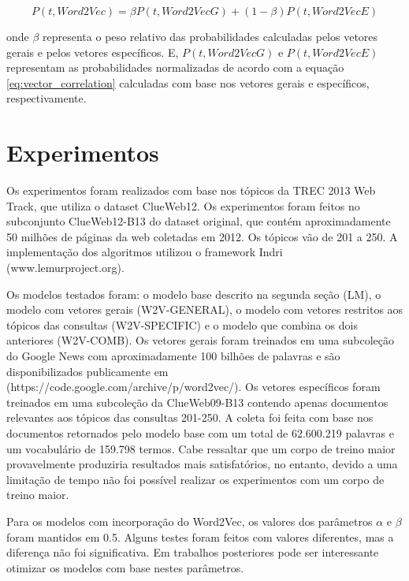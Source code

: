 \documentclass{article}
\begin{document}
\begin{equation}\label{eq:lm_with_w2vec}
P(t, Word2Vec) = \beta P(t, Word2VecG) + (1-\beta) P(t, Word2VecE)
\end{equation}

onde $ \beta $ representa o peso relativo das probabilidades calculadas pelos vetores gerais e pelos
vetores específicos. E, $ P(t, Word2VecG) $ e $ P(t, Word2VecE) $ representam as probabilidades
normalizadas de acordo com a equação \ref{eq:vector_correlation} calculadas com base nos vetores gerais e 
específicos, respectivamente.

\section{Experimentos}

Os experimentos foram realizados com base nos tópicos da TREC 2013 Web Track, que utiliza o dataset ClueWeb12. Os experimentos
foram feitos no subconjunto ClueWeb12-B13 do dataset original, que contém aproximadamente 50 milhões de páginas da web coletadas
em 2012. Os tópicos vão de 201 a 250. A implementação dos algoritmos utilizou o framework Indri (www.lemurproject.org). 

Os modelos testados foram: o modelo base descrito na segunda seção (LM), o modelo com vetores gerais (W2V-GENERAL), o modelo
com vetores restritos aos tópicos das consultas (W2V-SPECIFIC) e o modelo que combina os dois anteriores (W2V-COMB). Os vetores
gerais foram treinados em uma subcoleção do Google News com aproximadamente 100 bilhões de palavras e são disponibilizados publicamente
em (https://code.google.com/archive/p/word2vec/). Os vetores específicos foram treinados em uma subcoleção da ClueWeb09-B13 contendo
apenas documentos relevantes aos tópicos das consultas 201-250. A coleta foi feita com base nos documentos retornados pelo
modelo base com um total de 62.600.219 palavras e um vocabulário de 159.798 termos. Cabe ressaltar que um corpo de treino
maior provavelmente produziria resultados mais satisfatórios, no entanto, devido a uma limitação de tempo não foi possível
realizar os experimentos com um corpo de treino maior. 

Para os modelos com incorporação do Word2Vec, os valores dos parâmetros $ \alpha $ e $ \beta $ foram mantidos em 0.5.
Alguns testes foram feitos com valores diferentes, mas a diferença não foi significativa. Em trabalhos posteriores
pode ser interessante otimizar os modelos com base nestes parâmetros.
\end{document}
